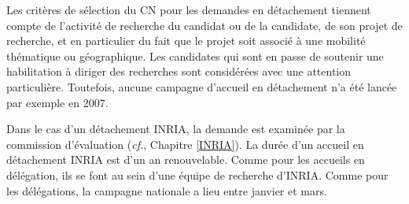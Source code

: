 Les crit\`eres de s\'election du CN pour les demandes en
d\'etachement tiennent compte de l'activit\'e de recherche du
candidat ou de la candidate, de son projet de recherche, et en particulier du fait que
le projet soit associ\'e \`a une mobilit\'e th\'ematique ou
g\'eographique. Les candidat\mp e\mp s qui sont en passe de soutenir une
habilitation \`a diriger des recherches sont consid\'er\'e\mp e\mp s avec une
attention particuli\`ere. Toutefois, aucune campagne d'accueil en
d\'etachement n'a \'et\'e lanc\'ee par exemple en 2007.

Dans le cas d'un d\'etachement INRIA, la demande est
examin\'ee par la commission d'\'evaluation ({\em cf.}, Chapitre \ref{INRIA}).
La dur\'ee d'un accueil en d\'etachement INRIA est d'un an
renouvelable. Comme pour les accueils en d\'el\'egation, ils se font
au sein d'une \'equipe de recherche d'INRIA. Comme pour les d\'el\'egations,
la campagne nationale a lieu entre janvier et mars.

